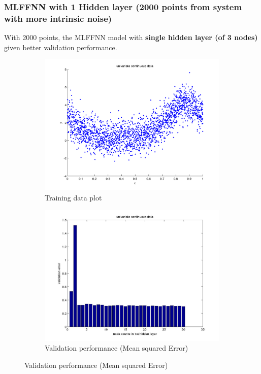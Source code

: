 \documentclass[fleqn]{article}
\begin{document}
\subsubsection{MLFFNN with 1 Hidden layer (2000 points from system with more intrinsic noise)}

With 2000 points, the MLFFNN model with \textbf{single hidden layer (of 3 nodes)} given better validation performance.


\begin{figure}[!ht]
\begin{subfigure}{.5\textwidth}
  \caption{Training data plot}
\includegraphics[scale=0.5]{pics/univariate_morenoise/dataPlot}
\end{subfigure}
\begin{subfigure}{.5\textwidth}
\caption{Validation performance (Mean squared Error)}
\includegraphics[scale=0.2]{pics/univariate_morenoise/univariate continuous data_validationerror}
\end{subfigure}
\end{figure}
\end{document}
